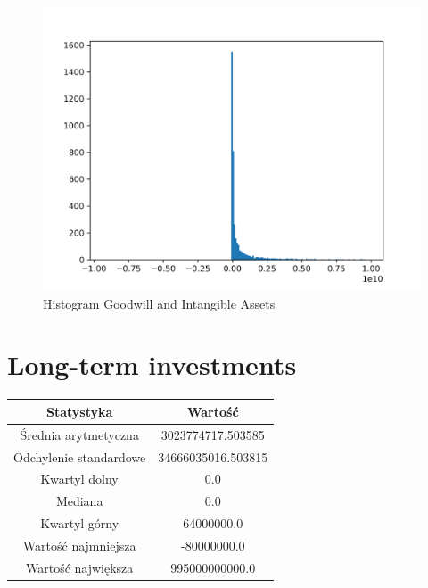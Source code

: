 \documentclass{article}
\begin{document}
\begin{figure}[h!]
    \includegraphics[width=\linewidth]{variables/Goodwill and Intangible Assets.png}
    \caption{Histogram Goodwill and Intangible Assets }
\end{figure}\section{ Long-term investments }

\begin{center}
    \begin{tabular}{|c | c|} 
    \hline
    Statystyka & Wartość \\
    \hline\hline
    Średnia arytmetyczna & 3023774717.503585 \\ 
    \hline
    Odchylenie standardowe & 34666035016.503815 \\
    \hline
    Kwartyl dolny & 0.0 \\
    \hline
    Mediana & 0.0 \\
    \hline
    Kwartyl górny & 64000000.0 \\
    \hline
    Wartość najmniejsza & -80000000.0 \\
    \hline
    Wartość największa & 995000000000.0 \\
    \hline
   \end{tabular}
\end{center}
\end{document}
